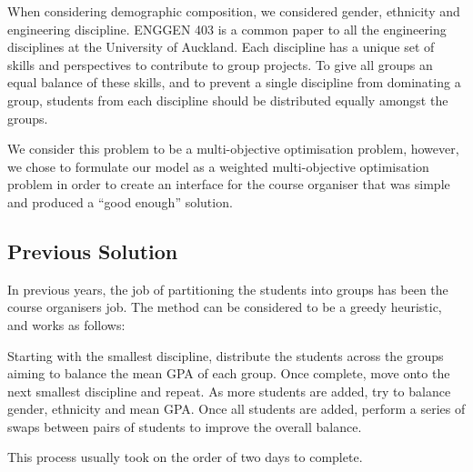 \documentclass[12pt]{ORSNZ}
\begin{document}
When considering demographic composition, we considered gender, ethnicity and engineering discipline. ENGGEN 403 is a common paper to all the engineering disciplines at the University of Auckland. Each discipline has a unique set of skills and perspectives to contribute to group projects. To give all groups an equal balance of these skills, and to prevent a single discipline from dominating a group, students from each discipline should be distributed equally amongst the groups.

We consider this problem to be a multi-objective optimisation problem, however, we chose to formulate our model as a weighted multi-objective optimisation problem in order to create an interface for the course organiser that was simple and produced a ``good enough'' solution.

\subsection{Previous Solution}

In previous years, the job of partitioning the students into groups has been the course organisers job. The method can be considered to be a greedy heuristic, and works as follows:

Starting with the smallest discipline, distribute the students across the groups aiming to balance the mean GPA of each group. Once complete, move onto the next smallest discipline and repeat. As more students are added, try to balance gender, ethnicity and mean GPA. Once all students are added, perform a series of swaps between pairs of students to improve the overall balance.

This process usually took on the order of two days to complete.
\end{document}
